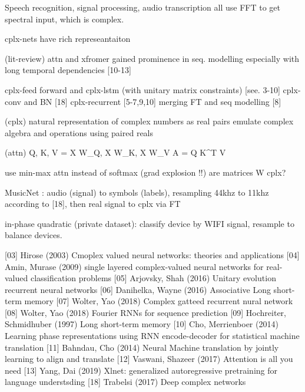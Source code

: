 Speech recognition, signal processing, audio transcription all use FFT to get
spectral input, which is complex.

cplx-nets have rich represeantaiton

(lit-review)
attn and xfromer gained prominence in seq. modelling especially with long
temporal dependencies [10-13]

cplx-feed forward and cplx-lstm (with unitary matrix constraints) [see. 3-10]
cplx-conv and BN [18]
cplx-recurrent [5-7,9,10] merging FT and seq modelling [8]

(cplx)
natural representation of complex numbers as real pairs
emulate complex algebra and operations using paired reals

(attn)
Q, K, V = X W_Q, X W_K, X W_V
A = Q K^T V

use min-max attn instead of softmax (grad explosion !!)
are matrices W cplx?

MusicNet : audio (signal) to symbols (labels), resampling 44khz to 11khz according to
[18], then real signal to cplx via FT

in-phase quadratic (private dataset): classify device by WIFI signal, resample to
balance devices.


[03] Hirose (2003) Cmoplex valued neural networks: theories and applications
[04] Amin, Murase (2009) single layered complex-valued neural networks for real-valued classification problems
[05] Arjovsky, Shah (2016) Unitary evolution recurrent neural networks
[06] Danihelka, Wayne (2016) Associative Long short-term memory
[07] Wolter, Yao (2018) Complex gatteed recurrent nural network
[08] Wolter, Yao (2018) Fourier RNNs for sequence prediction
[09] Hochreiter, Schmidhuber (1997) Long short-term memory
[10] Cho, Merrienboer (2014) Learning phase representations using RNN encode-decoder for statistical machine translation
[11] Bahndau, Cho (2014) Neural Machine translation by jointly learning to align and translate
[12] Vaswani, Shazeer (2017) Attention is all you need
[13] Yang, Dai (2019) Xlnet: generalized autoregressive pretraining for language understsding
[18] Trabelsi (2017) Deep complex networks